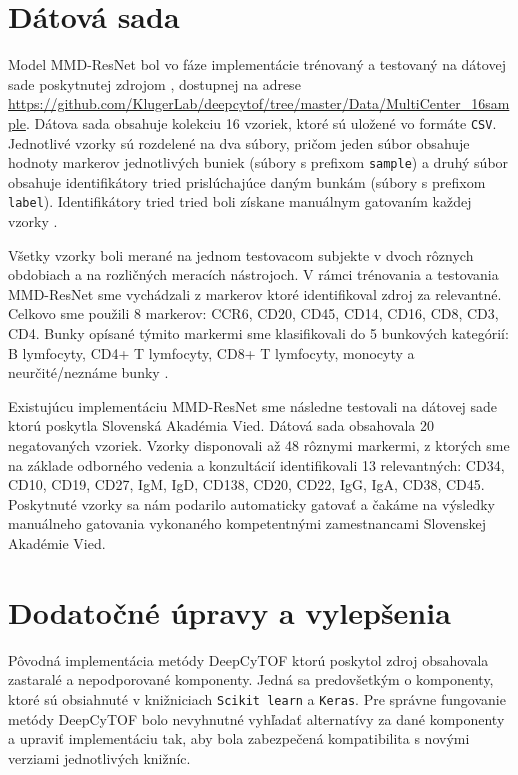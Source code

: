\section{Dátová sada}
\label{data_sets}

Model MMD-ResNet bol vo fáze implementácie trénovaný a testovaný na dátovej sade poskytnutej zdrojom \cite{Li2017}, dostupnej na adrese \url{https://github.com/KlugerLab/deepcytof/tree/master/Data/MultiCenter_16sample}. Dátova sada obsahuje kolekciu 16 vzoriek, ktoré sú uložené vo formáte \texttt{CSV}. Jednotlivé vzorky sú rozdelené na dva súbory, pričom jeden súbor obsahuje hodnoty markerov jednotlivých buniek (súbory s prefixom \texttt{sample}) a druhý súbor obsahuje identifikátory tried prislúchajúce daným bunkám (súbory s prefixom \texttt{label}). Identifikátory tried tried boli získane manuálnym gatovaním každej vzorky \cite{Li2017}. 

Všetky vzorky boli merané na jednom testovacom subjekte v dvoch rôznych obdobiach a na rozličných meracích nástrojoch. V rámci trénovania a testovania MMD-ResNet sme vychádzali z markerov ktoré identifikoval zdroj \cite{Li2017} za relevantné. Celkovo sme použili 8 markerov: CCR6, CD20, CD45, CD14, CD16, CD8, CD3, CD4. Bunky opísané týmito markermi sme klasifikovali do 5 bunkových kategórií: B lymfocyty, CD4+ T lymfocyty, CD8+ T lymfocyty, monocyty a neurčité/neznáme bunky \cite{Li2017}.

Existujúcu implementáciu MMD-ResNet sme následne testovali na dátovej sade ktorú poskytla Slovenská Akadémia Vied. Dátová sada obsahovala 20 negatovaných vzoriek. Vzorky disponovali až 48 rôznymi markermi, z ktorých sme na základe odborného vedenia a konzultácií identifikovali 13 relevantných: CD34, CD10, CD19, CD27, IgM, IgD, CD138, CD20, CD22, IgG, IgA, CD38, CD45. Poskytnuté vzorky sa nám podarilo automaticky gatovať a čakáme na výsledky manuálneho gatovania vykonaného kompetentnými zamestnancami Slovenskej Akadémie Vied.

\section{Dodatočné úpravy a vylepšenia}

Pôvodná implementácia metódy DeepCyTOF ktorú poskytol zdroj \cite{Li2017} obsahovala zastaralé a nepodporované komponenty. Jedná sa predovšetkým o komponenty, ktoré sú obsiahnuté v knižniciach \texttt{Scikit learn} a \texttt{Keras}. Pre správne fungovanie metódy DeepCyTOF bolo nevyhnutné vyhľadať alternatívy za dané komponenty a upraviť implementáciu tak, aby bola zabezpečená kompatibilita s novými verziami jednotlivých knižníc.

